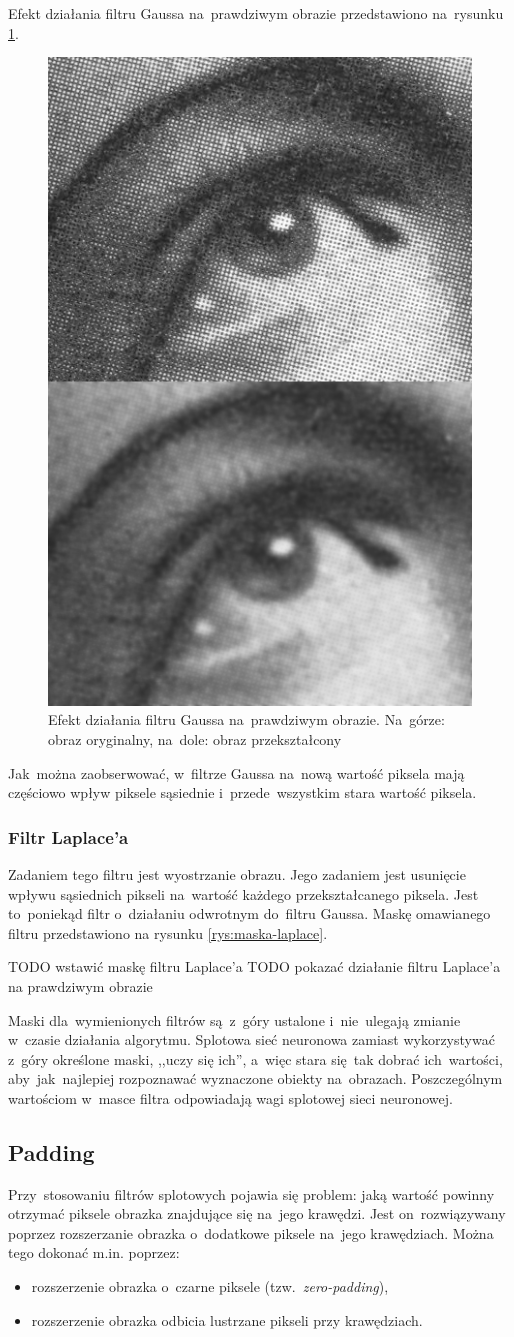 Efekt działania filtru Gaussa na~prawdziwym obrazie przedstawiono na~rysunku \ref{rys:gauss-conv-example}.
\begin{figure}[H]
	\centering
	\includegraphics[width=0.4\linewidth]{img/gauss-conv-real-example.jpg}
	\caption{Efekt działania filtru Gaussa na~prawdziwym obrazie. Na~górze: obraz oryginalny, na~dole: obraz
	przekształcony}
	\label{rys:gauss-conv-example}
\end{figure}

Jak~można zaobserwować, w~filtrze Gaussa na~nową wartość piksela mają częściowo wpływ piksele sąsiednie
i~przede~wszystkim stara wartość piksela.

\subsubsection{Filtr Laplace'a}
Zadaniem tego filtru jest wyostrzanie obrazu. Jego zadaniem jest usunięcie wpływu sąsiednich pikseli na~wartość każdego
przekształcanego piksela. Jest to~poniekąd filtr o~działaniu odwrotnym do~filtru Gaussa. Maskę omawianego filtru
 przedstawiono na rysunku \ref{rys:maska-laplace}.

TODO wstawić maskę filtru Laplace'a
TODO pokazać działanie filtru Laplace'a na prawdziwym obrazie

Maski dla~wymienionych filtrów są~z~góry ustalone i~nie~ulegają zmianie w~czasie działania algorytmu. Splotowa
sieć neuronowa zamiast wykorzystywać z~góry określone maski, ,,uczy się ich'', a~więc stara się~tak dobrać
ich~wartości, aby~jak~najlepiej rozpoznawać wyznaczone obiekty na~obrazach. Poszczególnym wartościom
w~masce filtra odpowiadają wagi splotowej sieci neuronowej. 

\subsection{Padding}
Przy~stosowaniu filtrów splotowych pojawia się problem: jaką wartość powinny otrzymać piksele obrazka
znajdujące się na~jego krawędzi. Jest on~rozwiązywany poprzez rozszerzanie obrazka o~dodatkowe piksele
na~jego krawędziach. Można tego dokonać m.in. poprzez:
\begin{itemize}
  \item rozszerzenie obrazka o~czarne piksele (tzw.~\textit{zero-padding}),
  \item rozszerzenie obrazka odbicia lustrzane pikseli przy krawędziach.
\end{itemize}

